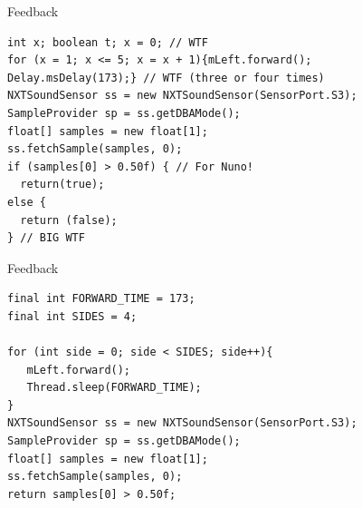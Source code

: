 \documentclass[color=pdftex,usenames,dvipsnames, aspectratio=169]{beamer}
\begin{document}
\begin{frame}[fragile]{Feedback}
\begin{lstlisting}
int x; boolean t; x = 0; // WTF
for (x = 1; x <= 5; x = x + 1){mLeft.forward();
Delay.msDelay(173);} // WTF (three or four times)
NXTSoundSensor ss = new NXTSoundSensor(SensorPort.S3);
SampleProvider sp = ss.getDBAMode();
float[] samples = new float[1];
ss.fetchSample(samples, 0); 
if (samples[0] > 0.50f) { // For Nuno!
  return(true);
else {
  return (false);
} // BIG WTF
\end{lstlisting}
\end{frame}
\begin{frame}[fragile]{Feedback}
\begin{lstlisting}
final int FORWARD_TIME = 173;
final int SIDES = 4;

for (int side = 0; side < SIDES; side++){
   mLeft.forward();
   Thread.sleep(FORWARD_TIME);
}
NXTSoundSensor ss = new NXTSoundSensor(SensorPort.S3);
SampleProvider sp = ss.getDBAMode();
float[] samples = new float[1];
ss.fetchSample(samples, 0); 
return samples[0] > 0.50f;
\end{lstlisting}
\end{frame}
\end{document}
